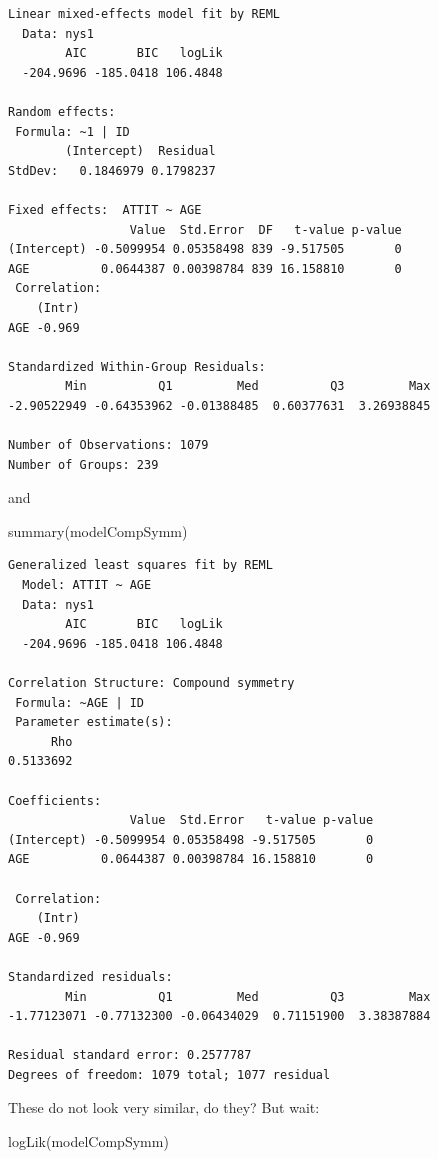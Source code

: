 \documentclass[
  letterpaper,
  DIV=11,
  numbers=noendperiod]{scrreprt}
\newenvironment{Shaded}{}{}
\newcommand{\FunctionTok}[1]{\textcolor[rgb]{0.02,0.16,0.49}{#1}}
\newcommand{\NormalTok}[1]{#1}
\begin{document}
\begin{verbatim}
Linear mixed-effects model fit by REML
  Data: nys1 
        AIC       BIC   logLik
  -204.9696 -185.0418 106.4848

Random effects:
 Formula: ~1 | ID
        (Intercept)  Residual
StdDev:   0.1846979 0.1798237

Fixed effects:  ATTIT ~ AGE 
                 Value  Std.Error  DF   t-value p-value
(Intercept) -0.5099954 0.05358498 839 -9.517505       0
AGE          0.0644387 0.00398784 839 16.158810       0
 Correlation: 
    (Intr)
AGE -0.969

Standardized Within-Group Residuals:
        Min          Q1         Med          Q3         Max 
-2.90522949 -0.64353962 -0.01388485  0.60377631  3.26938845 

Number of Observations: 1079
Number of Groups: 239 
\end{verbatim}

and

\begin{Shaded}
\begin{Highlighting}[]
\FunctionTok{summary}\NormalTok{(modelCompSymm)}
\end{Highlighting}
\end{Shaded}

\begin{verbatim}
Generalized least squares fit by REML
  Model: ATTIT ~ AGE 
  Data: nys1 
        AIC       BIC   logLik
  -204.9696 -185.0418 106.4848

Correlation Structure: Compound symmetry
 Formula: ~AGE | ID 
 Parameter estimate(s):
      Rho 
0.5133692 

Coefficients:
                 Value  Std.Error   t-value p-value
(Intercept) -0.5099954 0.05358498 -9.517505       0
AGE          0.0644387 0.00398784 16.158810       0

 Correlation: 
    (Intr)
AGE -0.969

Standardized residuals:
        Min          Q1         Med          Q3         Max 
-1.77123071 -0.77132300 -0.06434029  0.71151900  3.38387884 

Residual standard error: 0.2577787 
Degrees of freedom: 1079 total; 1077 residual
\end{verbatim}

These do not look very similar, do they? But wait:

\begin{Shaded}
\begin{Highlighting}[]
\FunctionTok{logLik}\NormalTok{(modelCompSymm)}
\end{Highlighting}
\end{Shaded}
\end{document}

